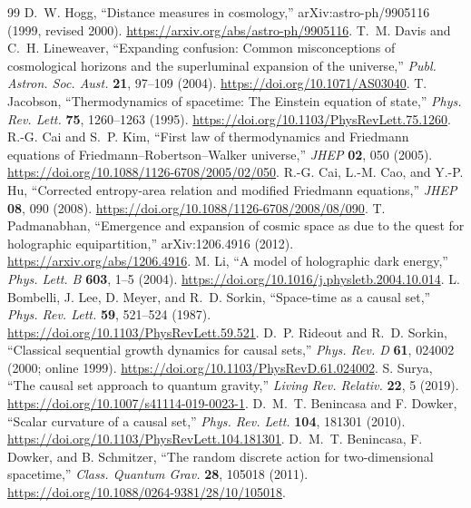\documentclass[11pt,a4paper]{article}
\begin{document}
\begin{thebibliography}{99}\small
{} D.~W. Hogg, ``Distance measures in cosmology,'' arXiv:astro-ph/9905116 (1999, revised 2000). \url{https://arxiv.org/abs/astro-ph/9905116}.
 T.~M. Davis and C.~H. Lineweaver, ``Expanding confusion: Common misconceptions of cosmological horizons and the superluminal expansion of the universe,'' \emph{Publ. Astron. Soc. Aust.} \textbf{21}, 97--109 (2004). \url{https://doi.org/10.1071/AS03040}.
 T. Jacobson, ``Thermodynamics of spacetime: The Einstein equation of state,'' \emph{Phys. Rev. Lett.} \textbf{75}, 1260--1263 (1995). \url{https://doi.org/10.1103/PhysRevLett.75.1260}.
 R.-G. Cai and S.~P. Kim, ``First law of thermodynamics and Friedmann equations of Friedmann--Robertson--Walker universe,'' \emph{JHEP} \textbf{02}, 050 (2005). \url{https://doi.org/10.1088/1126-6708/2005/02/050}.
 R.-G. Cai, L.-M. Cao, and Y.-P. Hu, ``Corrected entropy-area relation and modified Friedmann equations,'' \emph{JHEP} \textbf{08}, 090 (2008). \url{https://doi.org/10.1088/1126-6708/2008/08/090}.
 T. Padmanabhan, ``Emergence and expansion of cosmic space as due to the quest for holographic equipartition,'' arXiv:1206.4916 (2012). \url{https://arxiv.org/abs/1206.4916}.
 M. Li, ``A model of holographic dark energy,'' \emph{Phys. Lett. B} \textbf{603}, 1--5 (2004). \url{https://doi.org/10.1016/j.physletb.2004.10.014}.
 L. Bombelli, J. Lee, D. Meyer, and R.~D. Sorkin, ``Space-time as a causal set,'' \emph{Phys. Rev. Lett.} \textbf{59}, 521--524 (1987). \url{https://doi.org/10.1103/PhysRevLett.59.521}.
 D.~P. Rideout and R.~D. Sorkin, ``Classical sequential growth dynamics for causal sets,'' \emph{Phys. Rev. D} \textbf{61}, 024002 (2000; online 1999). \url{https://doi.org/10.1103/PhysRevD.61.024002}.
 S. Surya, ``The causal set approach to quantum gravity,'' \emph{Living Rev. Relativ.} \textbf{22}, 5 (2019). \url{https://doi.org/10.1007/s41114-019-0023-1}.
 D.~M.~T. Benincasa and F. Dowker, ``Scalar curvature of a causal set,'' \emph{Phys. Rev. Lett.} \textbf{104}, 181301 (2010). \url{https://doi.org/10.1103/PhysRevLett.104.181301}.
 D.~M.~T. Benincasa, F. Dowker, and B. Schmitzer, ``The random discrete action for two-dimensional spacetime,'' \emph{Class. Quantum Grav.} \textbf{28}, 105018 (2011). \url{https://doi.org/10.1088/0264-9381/28/10/105018}.

\end{thebibliography}
\end{document}
